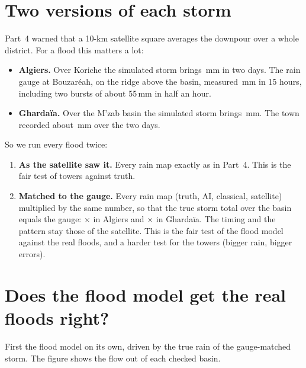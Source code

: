 \section{Two versions of each storm}
\label{sec:p5_versions}
Part~4 warned that a 10-km satellite square averages the downpour over a whole district. For a flood this matters a lot:
\begin{itemize}
\item \textbf{Algiers.} Over Koriche the simulated storm brings \PfiveAlgStormSat\,mm in two days. The rain gauge at
Bouzaréah, on the ridge above the basin, measured \PfiveAlgGaugeTotal\,mm in 15 hours, including two bursts of about
55\,mm in half an hour.
\item \textbf{Ghardaïa.} Over the M'zab basin the simulated storm brings \PfiveGhaStormSat\,mm. The town recorded about
\PfiveGhaGaugeTotal\,mm over the two days.
\end{itemize}
So we run every flood twice:
\begin{enumerate}
\item \textbf{As the satellite saw it.} Every rain map exactly as in Part~4. This is the fair test of towers against
truth.
\item \textbf{Matched to the gauge.} Every rain map (truth, AI, classical, satellite) multiplied by the same number, so
that the true storm total over the basin equals the gauge: $\times$\PfiveAlgFactor{} in Algiers and $\times$\PfiveGhaFactor{}
in Ghardaïa. The timing and the pattern stay those of the satellite. This is the fair test of the flood model against
the real floods, and a harder test for the towers (bigger rain, bigger errors).
\end{enumerate}

\section{Does the flood model get the real floods right?}
\label{sec:p5_check}
First the flood model on its own, driven by the true rain of the gauge-matched storm. The figure shows the flow out of
each checked basin.


